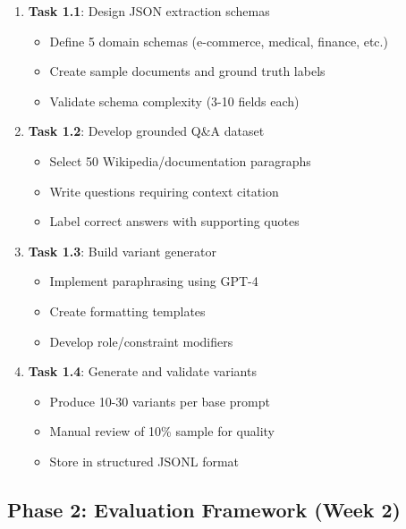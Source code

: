 \documentclass[11pt,a4paper]{article}
\begin{document}
\begin{enumerate}[leftmargin=*]
    \item \textbf{Task 1.1}: Design JSON extraction schemas
    \begin{itemize}
        \item Define 5 domain schemas (e-commerce, medical, finance, etc.)
        \item Create sample documents and ground truth labels
        \item Validate schema complexity (3-10 fields each)
    \end{itemize}
    
    \item \textbf{Task 1.2}: Develop grounded Q\&A dataset
    \begin{itemize}
        \item Select 50 Wikipedia/documentation paragraphs
        \item Write questions requiring context citation
        \item Label correct answers with supporting quotes
    \end{itemize}
    
    \item \textbf{Task 1.3}: Build variant generator
    \begin{itemize}
        \item Implement paraphrasing using GPT-4
        \item Create formatting templates
        \item Develop role/constraint modifiers
    \end{itemize}
    
    \item \textbf{Task 1.4}: Generate and validate variants
    \begin{itemize}
        \item Produce 10-30 variants per base prompt
        \item Manual review of 10\% sample for quality
        \item Store in structured JSONL format
    \end{itemize}
\end{enumerate}

\subsection{Phase 2: Evaluation Framework (Week 2)}
\end{document}
